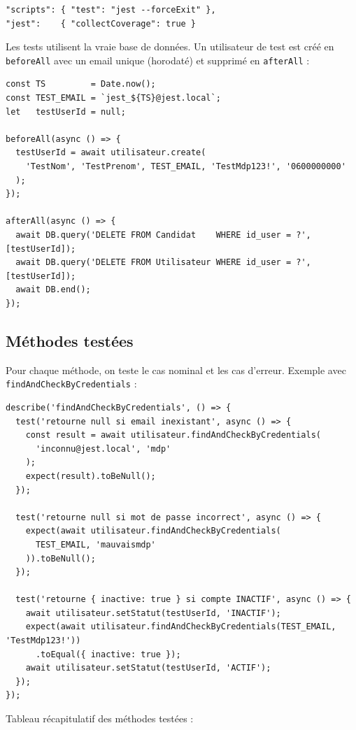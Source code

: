 \documentclass[12pt,a4paper]{article}
\begin{document}
\begin{lstlisting}
"scripts": { "test": "jest --forceExit" },
"jest":    { "collectCoverage": true }
\end{lstlisting}

Les tests utilisent la vraie base de données. Un utilisateur de test est créé en \texttt{beforeAll} avec un email unique (horodaté) et supprimé en \texttt{afterAll} :

\begin{lstlisting}
const TS         = Date.now();
const TEST_EMAIL = `jest_${TS}@jest.local`;
let   testUserId = null;

beforeAll(async () => {
  testUserId = await utilisateur.create(
    'TestNom', 'TestPrenom', TEST_EMAIL, 'TestMdp123!', '0600000000'
  );
});

afterAll(async () => {
  await DB.query('DELETE FROM Candidat    WHERE id_user = ?', [testUserId]);
  await DB.query('DELETE FROM Utilisateur WHERE id_user = ?', [testUserId]);
  await DB.end();
});
\end{lstlisting}

\subsection{Méthodes testées}

Pour chaque méthode, on teste le cas nominal et les cas d'erreur. Exemple avec \texttt{findAndCheckByCredentials} :

\begin{lstlisting}
describe('findAndCheckByCredentials', () => {
  test('retourne null si email inexistant', async () => {
    const result = await utilisateur.findAndCheckByCredentials(
      'inconnu@jest.local', 'mdp'
    );
    expect(result).toBeNull();
  });

  test('retourne null si mot de passe incorrect', async () => {
    expect(await utilisateur.findAndCheckByCredentials(
      TEST_EMAIL, 'mauvaismdp'
    )).toBeNull();
  });

  test('retourne { inactive: true } si compte INACTIF', async () => {
    await utilisateur.setStatut(testUserId, 'INACTIF');
    expect(await utilisateur.findAndCheckByCredentials(TEST_EMAIL, 'TestMdp123!'))
      .toEqual({ inactive: true });
    await utilisateur.setStatut(testUserId, 'ACTIF');
  });
});
\end{lstlisting}

Tableau récapitulatif des méthodes testées :
\end{document}
